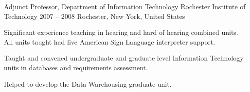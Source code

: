 \begin{cventries}
\cventry
    {Adjunct Professor, Department of Information Technology} %
    {Rochester Institute of Technology} %
    {2007 -- 2008} %
    {Rochester, New York, United States} %
    {\begin{cvitems}%
    \item {Significant experience teaching in hearing and hard of hearing combined units. All units taught had live American Sign Language interpreter support.}
    \item {Taught and convened undergraduate and graduate level Information Technology units in databases and requirements assessment.} 
    \item {Helped to develop the Data Warehousing graduate unit.}
    \end{cvitems}}
    
%     
%     
%     
%       

\end{cventries}
